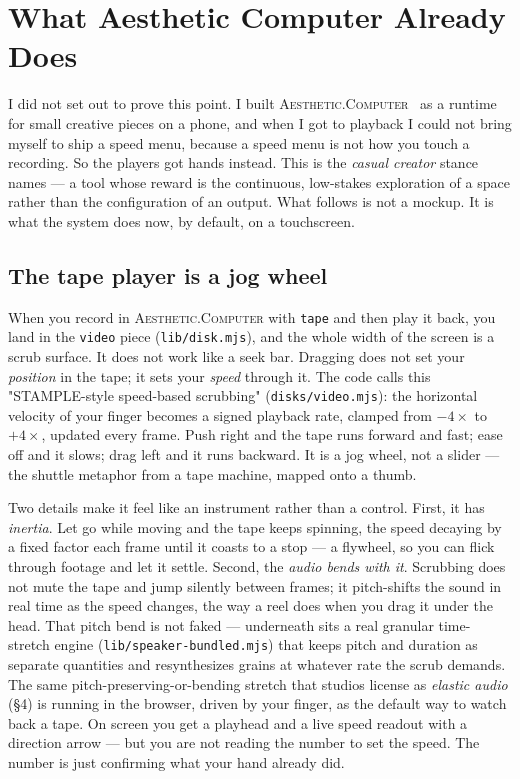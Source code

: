 \documentclass[10pt,letterpaper,twocolumn]{article}
\newcommand{\ac}{\textsc{Aesthetic.Computer}}
\begin{document}
\section{What Aesthetic Computer Already Does}

I did not set out to prove this point. I built \ac{}~\citep{scudder2026ac} as a runtime for small creative pieces on a phone, and when I got to playback I could not bring myself to ship a speed menu, because a speed menu is not how you touch a recording. So the players got hands instead. This is the \emph{casual creator} stance \citet{compton2015casual} names --- a tool whose reward is the continuous, low-stakes exploration of a space rather than the configuration of an output. What follows is not a mockup. It is what the system does now, by default, on a touchscreen.

\subsection{The tape player is a jog wheel}

When you record in \ac{} with \texttt{tape} and then play it back, you land in the \texttt{video} piece (\texttt{lib/disk.mjs}), and the whole width of the screen is a scrub surface. It does not work like a seek bar. Dragging does not set your \emph{position} in the tape; it sets your \emph{speed} through it. The code calls this "STAMPLE-style speed-based scrubbing" (\texttt{disks/video.mjs}): the horizontal velocity of your finger becomes a signed playback rate, clamped from $-4\times$ to $+4\times$, updated every frame. Push right and the tape runs forward and fast; ease off and it slows; drag left and it runs backward. It is a jog wheel, not a slider --- the shuttle metaphor from a tape machine, mapped onto a thumb.

Two details make it feel like an instrument rather than a control. First, it has \emph{inertia}. Let go while moving and the tape keeps spinning, the speed decaying by a fixed factor each frame until it coasts to a stop --- a flywheel, so you can flick through footage and let it settle. Second, the \emph{audio bends with it}. Scrubbing does not mute the tape and jump silently between frames; it pitch-shifts the sound in real time as the speed changes, the way a reel does when you drag it under the head. That pitch bend is not faked --- underneath sits a real granular time-stretch engine (\texttt{lib/speaker-bundled.mjs}) that keeps pitch and duration as separate quantities and resynthesizes grains at whatever rate the scrub demands. The same pitch-preserving-or-bending stretch that studios license as \emph{elastic audio} (\S4) is running in the browser, driven by your finger, as the default way to watch back a tape. On screen you get a playhead and a live speed readout with a direction arrow --- but you are not reading the number to set the speed. The number is just confirming what your hand already did.
\end{document}
